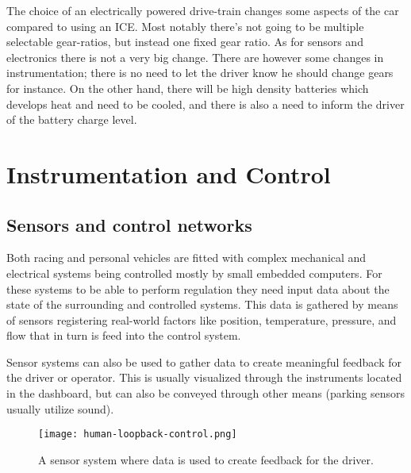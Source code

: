 The choice of an electrically powered drive-train changes some aspects of the 
car compared to using an ICE. Most notably there's not going to be multiple 
selectable gear-ratios, 
but instead one fixed gear ratio. As for sensors and electronics there is not 
a very big change. There are however some changes in instrumentation;
there is no need to
let the driver know he should change gears for instance.  
On the other hand, there will be high density batteries which develops heat and need to be cooled, and there is also a need to inform the driver
of the battery charge level.

\section{Instrumentation and Control}


\subsection{Sensors and control networks}
Both racing  and  personal vehicles are fitted with complex mechanical and electrical
systems being controlled mostly by small embedded computers. For these systems
to be able to perform regulation they need input data about the state of
the surrounding and controlled systems. This data is gathered by means of
sensors registering real-world factors like position, temperature, pressure,
and flow that in turn is feed into the control system.

Sensor systems can also be used to gather data to create meaningful feedback 
for the driver or operator. This is usually visualized through the instruments
located in the dashboard, but can also be conveyed through other means (parking
sensors usually utilize sound).

\begin{figure}[!htbp]
	\texttt{[image: human-loopback-control.png]}
	\caption{A sensor system where data is used to create feedback for the driver.}
	\label{fig:human-loopback}
\end{figure}

